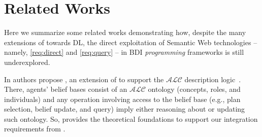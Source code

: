\documentclass[
]{ceurart}
\begin{document}
\section{Related Works}
\label{sec:related-works}




Here we summarize some related works demonstrating how,
despite the many extensions of \agentspeak{} towards \ac{DL},
the direct exploitation of Semantic Web technologies
-- namely, \ref{req:direct} and \ref{req:query} --
in \ac{BDI} \emph{programming} frameworks is still underexplored.


In \cite{DBLP:conf/dalt/MoreiraVBH05} authors propose \agentspeakdl{},
an extension of \agentspeak{} to support the $\mathcal{ALC}$ description logic~\cite{BAADER2008135}.
%
There,
agents' belief bases consist of an $\mathcal{ALC}$ ontology
(concepts, roles, and individuals)
and any operation involving access to the belief base
(e.g., plan selection, belief update, and query)
imply either reasoning about or updating such ontology.
%
So,
\agentspeakdl{} provides the theoretical foundations to support our integration requirements from .
\end{document}
